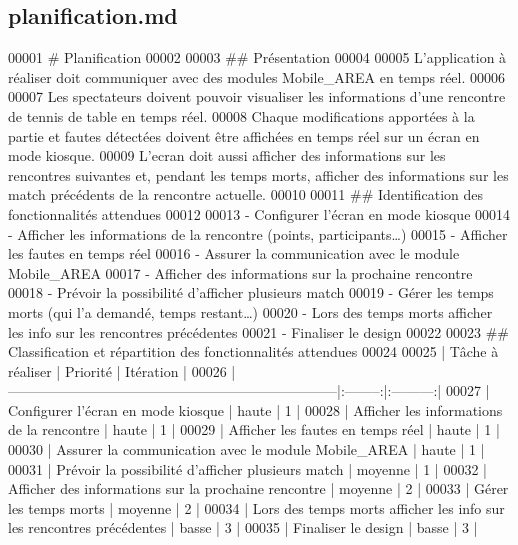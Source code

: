 \hypertarget{planification_8md_source}{}\subsection{planification.\+md}

\begin{DoxyCode}
00001 # Planification
00002 
00003 ## Présentation
00004 
00005 L'application à réaliser doit communiquer avec des modules Mobile\_AREA en temps réel.
00006 
00007 Les spectateurs doivent pouvoir visualiser les informations d'une rencontre de tennis de table en
       temps réel.
00008 Chaque modifications apportées à la partie et fautes détectées doivent être affichées en temps réel
       sur un écran en mode kiosque.
00009 L'ecran doit aussi afficher des informations sur les rencontres suivantes et, pendant les temps morts,
       afficher des informations sur les match précédents de la rencontre actuelle.
00010 
00011 ## Identification des fonctionnalités attendues
00012 
00013 - Configurer l'écran en mode kiosque
00014 - Afficher les informations de la rencontre (points, participants…)
00015 - Afficher les fautes en temps réel
00016 - Assurer la communication avec le module Mobile\_AREA
00017 - Afficher des informations sur la prochaine rencontre
00018 - Prévoir la possibilité d'afficher plusieurs match
00019 - Gérer les temps morts (qui l’a demandé, temps restant…)
00020 - Lors des temps morts afficher les info sur les rencontres précédentes
00021 - Finaliser le design
00022 
00023 ## Classification et répartition des fonctionnalités attendues
00024 
00025 | Tâche à réaliser                                                      | Priorité | Itération |
00026 |-----------------------------------------------------------------------|:--------:|:---------:|
00027 | Configurer l'écran en mode kiosque                                    |   haute  |     1     |
00028 | Afficher les informations de la rencontre                             |   haute  |     1     |
00029 | Afficher les fautes en temps réel                                     |   haute  |     1     |
00030 | Assurer la communication avec le module Mobile\_AREA                   |   haute  |     1     |
00031 | Prévoir la possibilité d'afficher plusieurs match                     |  moyenne |     1     |
00032 | Afficher des informations sur la prochaine rencontre                  |  moyenne |     2     |
00033 | Gérer les temps morts                                                 |  moyenne |     2     |
00034 | Lors des temps morts afficher les info sur les rencontres précédentes |   basse  |     3     |
00035 | Finaliser le design                                                   |   basse  |     3     |
\end{DoxyCode}
